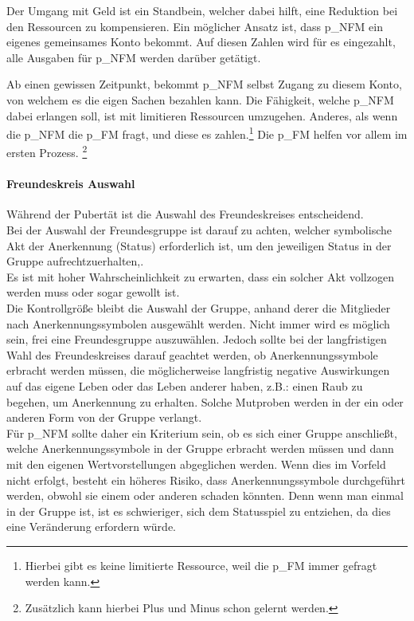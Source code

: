 Der Umgang mit Geld ist ein Standbein, welcher dabei hilft, eine Reduktion bei den Ressourcen zu kompensieren. Ein möglicher Ansatz ist, dass \gls{p_NFM} ein eigenes gemeinsames Konto bekommt. Auf diesen Zahlen wird für es eingezahlt, alle Ausgaben für \gls{p_NFM} werden darüber getätigt.

Ab einen gewissen Zeitpunkt, bekommt \gls{p_NFM} selbst Zugang zu diesem Konto, von welchem es die eigen Sachen bezahlen kann. Die Fähigkeit, welche \gls{p_NFM} dabei erlangen soll, ist mit limitieren Ressourcen umzugehen. Anderes, als wenn die \gls{p_NFM} die \gls{p_FM} fragt, und diese es zahlen.\footnote{
	Hierbei gibt es keine limitierte Ressource, weil die \gls{p_FM} immer gefragt werden kann.
} Die \gls{p_FM} helfen vor allem im ersten Prozess. \footnote{
	Zusätzlich kann hierbei Plus und Minus schon gelernt werden.
}

\paragraph{Freundeskreis Auswahl}

Während der Pubertät ist die Auswahl des Freundeskreises entscheidend.\\


Bei der Auswahl der Freundesgruppe ist darauf zu achten, welcher symbolische Akt der Anerkennung (Status) erforderlich ist, um den jeweiligen Status in der Gruppe aufrechtzuerhalten,.\\


Es ist mit hoher Wahrscheinlichkeit zu erwarten, dass ein solcher Akt vollzogen werden muss oder sogar gewollt ist.\\


Die Kontrollgröße bleibt die Auswahl der Gruppe, anhand derer die Mitglieder nach Anerkennungssymbolen ausgewählt werden. Nicht immer wird es möglich sein, frei eine Freundesgruppe auszuwählen. Jedoch sollte bei der langfristigen Wahl des Freundeskreises darauf geachtet werden, ob Anerkennungssymbole erbracht werden müssen, die möglicherweise langfristig negative Auswirkungen auf das eigene Leben oder das Leben anderer haben, z.B.: einen Raub zu begehen, um Anerkennung zu erhalten. Solche Mutproben werden in der ein oder anderen Form von der Gruppe verlangt.\\


Für \gls{p_NFM} sollte daher ein Kriterium sein, ob es sich einer Gruppe anschließt, welche Anerkennungssymbole in der Gruppe erbracht werden müssen und dann mit den eigenen Wertvorstellungen abgeglichen werden. Wenn dies im Vorfeld nicht erfolgt, besteht ein höheres Risiko, dass Anerkennungssymbole durchgeführt werden, obwohl sie einem oder anderen schaden könnten. Denn wenn man einmal in der Gruppe ist, ist es schwieriger, sich dem Statusspiel zu entziehen, da dies eine Veränderung erfordern würde.\\


